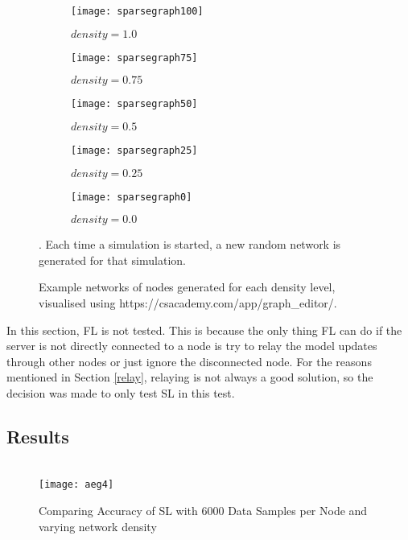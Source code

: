 \begin{figure}[H]
	\centering
	\begin{subfigure}[b]{0.35\textwidth}
		\centering
		\texttt{[image: sparsegraph100]}
		\caption{$density=1.0$}
	\end{subfigure}
	\begin{subfigure}[b]{0.35\textwidth}
		\centering
		\texttt{[image: sparsegraph75]}
		\caption{$density=0.75$}
	\end{subfigure}
	\begin{subfigure}[b]{0.35\textwidth}
		\centering
		\texttt{[image: sparsegraph50]}
		\caption{$density=0.5$}
	\end{subfigure}
	\begin{subfigure}[b]{0.35\textwidth}
		\centering
		\texttt{[image: sparsegraph25]}
		\caption{$density=0.25$}
	\end{subfigure}
	\begin{subfigure}[b]{0.35\textwidth}
		\centering
		\texttt{[image: sparsegraph0]}
		\caption{$density=0.0$}
	\end{subfigure}
	\caption{Example networks of nodes generated for each density level, visualised using https://csacademy.com/app/graph\_editor/. }. Each time a simulation is started, a new random network is generated for that simulation.
\end{figure}


In this section, FL is not tested. This is because the only thing FL can do if the server is not directly connected to a node is try to relay the model updates through other nodes or just ignore the disconnected node. For the reasons mentioned in Section \ref{relay}, relaying is not always a good solution, so the decision was made to only test SL in this test.


\subsection{Results}


\begin{figure}[H] 
	 \\
	\texttt{[image: aeg4]}
	\caption{Comparing Accuracy of SL with 6000 Data Samples per Node and varying network density}
	\label{aeg4}
\end{figure}

